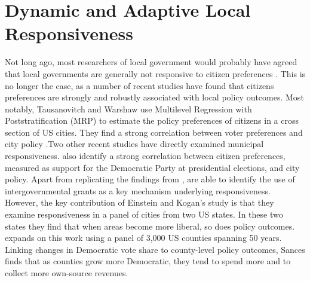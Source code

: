 \documentclass[a4paper,12pt]{article}
\begin{document}
\section*{Dynamic and Adaptive Local Responsiveness}

 Not long ago, most researchers of local government would probably have agreed that local governments are generally not responsive to citizen preferences \citep{peterson1981city}. This is no longer the case, as a number of recent studies have found that citizens preferences are strongly and robustly associated with local policy outcomes. Most notably, Tausanovitch and Warshaw use Multilevel Regression with Poststratification (MRP) to estimate the policy preferences of citizens in a cross section of US cities. They find a strong correlation between voter preferences and city policy \citep[for earlier efforts, see ][]{hajnal2010or,palus2010responsiveness}.Two other recent studies have directly examined municipal responsiveness. \cite{einstein2016pushing} also identify a strong correlation between citizen preferences, measured as support for the Democratic Party at presidential elections,  and city policy. Apart from replicating the findings from \citeauthor{tausanovitch2014representation}, \citeauthor{einstein2016pushing} are able to identify the use of intergovernmental grants as a key mechanism underlying responsiveness. However, the key contribution of Einstein and Kogan's study is that they examine responsiveness in a panel of cities from two US states. In these two states they find that when areas become more liberal, so does policy outcomes. \citet{sances2017voters} expands on this work using a panel of 3,000 US counties spanning 50 years. Linking changes in Democratic vote share to county-level policy outcomes, Sances finds that as counties grow more Democratic, they tend to spend more and to collect more own-source revenues.
 
\end{document}

